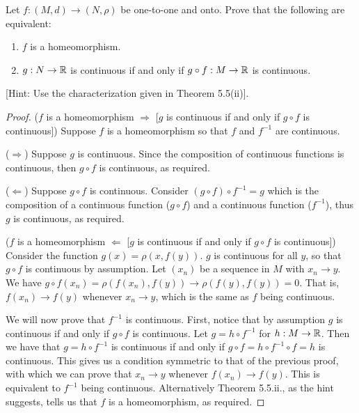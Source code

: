 \begin{exercise}{54}
Let $f:(M,d)\to(N,\rho)$ be one-to-one and onto.
Prove that the following are equivalent:
\begin{enumerate}
    \item $f$ is a homeomorphism.
    \item $g:N\to \mathbb{R}$ is continuous if and only if $g\circ f:M\to\mathbb{R}$ is continuous.
\end{enumerate}
[Hint: Use the characterization given in Theorem 5.5(ii)].
\end{exercise}
\begin{proof}
($f$ is a homeomorphism $\Rightarrow$ [$g$ is continuous if and only if $g\circ f$ is continuous]) 
Suppose $f$ is a homeomorphism so that $f$ and $f^{-1}$ are continuous.

($\Rightarrow$) 
Suppose $g$ is continuous.
Since the composition of continuous functions is continuous, then $g\circ f$ is continuous, as required.

($\Leftarrow$)
Suppose $g\circ f$ is continuous.
Consider $(g\circ f)\circ f^{-1}=g$ which is the composition of a continuous function ($g\circ f$) and a continuous function ($f^{-1}$), thus $g$ is continuous, as required.

($f$ is a homeomorphism $\Leftarrow$ [$g$ is continuous if and only if $g\circ f$ is continuous]) 
Consider the function $g(x) = \rho(x,f(y))$.
$g$ is continuous for all $y$, so that $g\circ f$ is continuous by assumption.
Let $(x_n)$ be a sequence in $M$ with $x_n\to y$.
We have $g\circ f(x_n) = \rho(f(x_n),f(y)) \to \rho(f(y),f(y)) =0$.
That is, $f(x_n)\to f(y)$ whenever $x_n\to y$, which is the same as $f$ being continuous.

We will now prove that $f^{-1}$ is continuous.
First, notice that by assumption $g$ is continuous if and only if $g\circ f$ is continuous. 
Let $g=h\circ f^{-1}$ for $h:M\to \mathbb{R}$.
Then we have that $g=h\circ f^{-1}$ is continuous if and only if $g\circ f =h\circ f^{-1}\circ f =h$ is continuous.
This gives us a condition symmetric to that of the previous proof, with which we can prove that $x_n\to y$ whenever $f(x_n)\to f(y)$.
This is equivalent to $f^{-1}$ being continuous.
Alternatively Theorem 5.5.ii., as the hint suggests, tells us that $f$ is a homeomorphism, as required.
\end{proof} 

